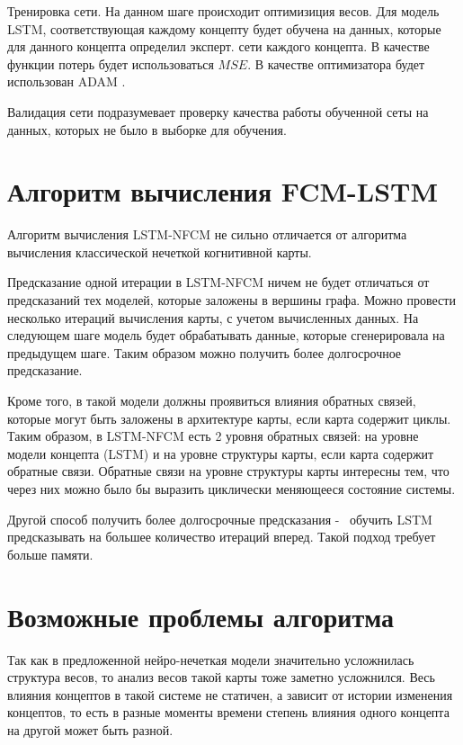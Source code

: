 Тренировка сети. На данном шаге происходит оптимизиция весов.
Для модель LSTM, соответствующая каждому концепту будет обучена
на данных, которые для данного концепта определил эксперт.
сети каждого концепта. В качестве функции потерь будет использоваться $ MSE $.
В качестве оптимизатора будет использован ADAM \cite{adam2014}.

Валидация сети подразумевает
проверку качества работы обученной сеты на данных,
которых не было в выборке для обучения.

\section{Алгоритм вычисления FCM-LSTM}

Алгоритм вычисления LSTM-NFCM не сильно отличается от
алгоритма вычисления классической нечеткой когнитивной карты.

Предсказание одной итерации в LSTM-NFCM ничем не будет отличаться
от предсказаний тех моделей, которые заложены в вершины графа.
Можно провести несколько итераций вычисления карты, с учетом вычисленных
данных. На следующем шаге модель будет обрабатывать данные,
которые сгенерировала на предыдущем шаге. Таким образом можно получить
более долгосрочное предсказание.

Кроме того, в такой модели должны проявиться влияния обратных связей, которые могут
быть заложены в архитектуре карты, если карта содержит циклы.
Таким образом, в LSTM-NFCM есть 2 уровня обратных связей:
на уровне модели концепта (LSTM) и на уровне структуры карты,
если карта содержит обратные связи.
Обратные связи на уровне структуры карты интересны тем, что
через них можно было бы выразить циклически меняющееся состояние системы.

Другой способ получить более долгосрочные предсказания -~ обучить LSTM
предсказывать на большее количество итераций вперед. Такой подход
требует больше памяти.

\section{Возможные проблемы алгоритма}

Так как в предложенной нейро-нечеткая модели
значительно усложнилась структура весов, то
анализ весов такой карты тоже заметно усложнился.
Весь влияния концептов в такой системе не статичен,
а зависит от истории изменения концептов, то есть
в разные моменты времени степень влияния одного концепта
на другой может быть разной.

